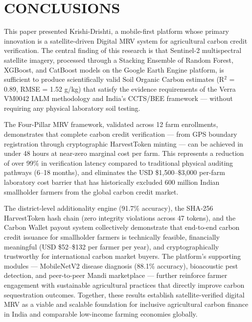 \documentclass[10pt,a4paper]{article}
\begin{document}
\section{CONCLUSIONS}

This paper presented Krishi-Drishti, a mobile-first platform whose primary innovation is a satellite-driven Digital MRV system for agricultural carbon credit verification. The central finding of this research is that Sentinel-2 multispectral satellite imagery, processed through a Stacking Ensemble of Random Forest, XGBoost, and CatBoost models on the Google Earth Engine platform, is sufficient to produce scientifically valid Soil Organic Carbon estimates (R$^2$ = 0.89, RMSE = 1.52 g/kg) that satisfy the evidence requirements of the Verra VM0042 IALM methodology and India's CCTS/BEE framework — without requiring any physical laboratory soil testing.

The Four-Pillar MRV framework, validated across 12 farm enrollments, demonstrates that complete carbon credit verification — from GPS boundary registration through cryptographic HarvestToken minting — can be achieved in under 48 hours at near-zero marginal cost per farm. This represents a reduction of over 99\% in verification latency compared to traditional physical auditing pathways (6--18 months), and eliminates the USD \$1,500--\$3,000 per-farm laboratory cost barrier that has historically excluded 600 million Indian smallholder farmers from the global carbon credit market.

The district-level additionality engine (91.7\% accuracy), the SHA-256 HarvestToken hash chain (zero integrity violations across 47 tokens), and the Carbon Wallet payout system collectively demonstrate that end-to-end carbon credit issuance for smallholder farmers is technically feasible, financially meaningful (USD \$52--\$132 per farmer per year), and cryptographically trustworthy for international carbon market buyers. The platform's supporting modules — MobileNetV2 disease diagnosis (88.1\% accuracy), bioacoustic pest detection, and peer-to-peer Mandi marketplace — further reinforce farmer engagement with sustainable agricultural practices that directly improve carbon sequestration outcomes. Together, these results establish satellite-verified digital MRV as a viable and scalable foundation for inclusive agricultural carbon finance in India and comparable low-income farming economies globally.
\end{document}
